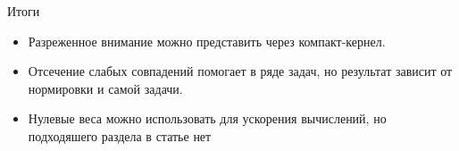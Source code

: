 \documentclass[aspectratio=169,12pt]{beamer}
\begin{document}
\begin{frame}{Итоги}
  \begin{itemize}
    \setlength{\itemsep}{4mm}
    
          \item Разреженное внимание можно представить
          через компакт-кернел. 
    
          \item Отсечение слабых совпадений помогает
          в ряде задач, но результат зависит от нормировки и самой задачи.
    
          \item Нулевые веса можно использовать для ускорения вычислений, 
          но подходяшего раздела в статье нет

  \end{itemize}
\end{frame}
\end{document}
